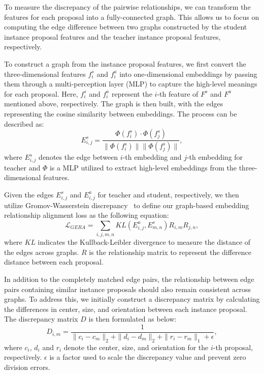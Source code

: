 To measure the discrepancy of the pairwise relationships, we can transform the features for each proposal into a fully-connected graph. This allows us to focus on computing the edge difference between two graphs constructed by the student instance proposal features and the teacher instance proposal features, respectively.

To construct a graph from the instance proposal features, we first convert the three-dimensional features $f^{s}_{i}$ and $f^{a}_{i}$ into one-dimensional embeddings by passing them through a multi-perception layer (MLP) to capture the high-level meanings for each proposal. Here, $f^{s}_{i}$ and $f^{a}_{i}$ represent the $i$-th feature of $F^{s}$ and $F^{a}$ mentioned above, respectively. The graph is then built, with the edges representing the cosine similarity between embeddings. The process can be described as:
\begin{equation}
    E^{s}_{i, j} = \frac{\Phi(f^{s}_{i}) \cdot \Phi(f^{s}_{j})}{\|\Phi(f^{s}_{i})\| \|\Phi(f^{s}_{j})\|},
\end{equation}
where $E^{s}_{i, j}$ denotes the edge between $i$-th embedding and $j$-th embedding for teacher and $\Phi$ is a MLP utilized to extract high-level embeddings from the three-dimensional features.

Given the edges $E^{s}_{i, j}$ and $E^{a}_{i, j}$ for teacher and student, respectively, we then utilize Gromov-Wasserstein discrepancy~\cite{peyre2016gromov} to define our graph-based embedding relationship alignment loss as the following equation:
\begin{equation}
    \mathcal{L}_{GERA} = \sum_{i, j, m, n} KL(E^{a}_{i,j}, E^{s}_{m, n})R_{i, m}R_{j, n},
\end{equation}
where $KL$ indicates the Kullback-Leibler divergence to measure the distance of the edges across graphs. $R$ is the relationship matrix to represent the difference distance between each proposal.

In addition to the completely matched edge pairs, the relationship between edge pairs containing similar instance proposals should also remain consistent across graphs. To address this, we initially construct a discrepancy matrix by calculating the differences in center, size, and orientation between each instance proposal. The discrepancy matrix $D$ is then formulated as below:
\begin{equation}
    D_{i,m} = \frac{1}{\|c_{i}-c_{m}\|_{2}+\|d_{i}-d_{m}\|_{2}+\|r_{i}-r_{m}\|_{1}+\epsilon},
\end{equation}
where $c_{i}$, $d_{i}$ and $r_{i}$ denote the center, size, and orientation for the $i$-th proposal, respectively. $\epsilon$ is a factor used to scale the discrepancy value and prevent zero division errors.

